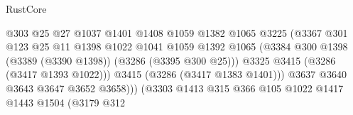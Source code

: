 \begin{lexlean}{RustCore}
\begin{coremodule}
                                                @303
                                                @25
                                                @27
                                                @1037
                                                @1401
                                                @1408
                                                @1059
                                                @1382
                                                @1065
                                                @3225
                                                (@3367
                                                  @301
                                                  @123
                                                  @25
                                                  @11
                                                  @1398
                                                  @1022
                                                  @1041
                                                  @1059
                                                  @1392
                                                  @1065
                                                  (@3384
                                                    @300
                                                    @1398
                                                    (@3389 (@3390 @1398))
                                                    (@3286 (@3395 @300 @25)))
                                                  @3325
                                                  @3415
                                                  (@3286 (@3417 @1393 @1022)))
                                                @3415
                                                (@3286 (@3417 @1383 @1401)))
                                              @3637
                                              @3640
                                              @3643
                                              @3647
                                              @3652
                                              @3658)))
                                        (@3303
                                          @1413
                                          @315
                                          @366
                                          @105
                                          @1022
                                          @1417
                                          @1443
                                          @1504
                                          (@3179
                                            @312

\end{coremodule}
\end{lexlean}
